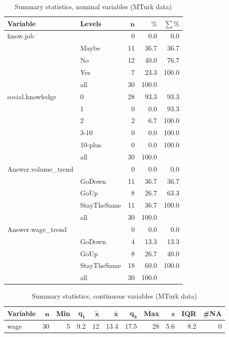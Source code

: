 \documentclass[a4paper,10pt]{article}\usepackage[]{graphicx}\usepackage[]{color}
\begin{document}
\begin{table}[ht]
\centering
{\footnotesize
\begin{tabular}{ll|rrr}
 \textbf{Variable} & \textbf{Levels} & $\mathbf{n}$ & $\mathbf{\%}$ & $\mathbf{\sum \%}$ \\ 
  \hline
know.job &  & 0 & 0.0 & 0.0 \\ 
   & Maybe & 11 & 36.7 & 36.7 \\ 
   & No & 12 & 40.0 & 76.7 \\ 
   & Yes & 7 & 23.3 & 100.0 \\ 
   \hline
 & all & 30 & 100.0 &  \\ 
   \hline
\hline
social.knowledge & 0 & 28 & 93.3 & 93.3 \\ 
   & 1 & 0 & 0.0 & 93.3 \\ 
   & 2 & 2 & 6.7 & 100.0 \\ 
   & 3-10 & 0 & 0.0 & 100.0 \\ 
   & 10-plus & 0 & 0.0 & 100.0 \\ 
   \hline
 & all & 30 & 100.0 &  \\ 
   \hline
\hline
Answer.volume\_trend &  & 0 & 0.0 & 0.0 \\ 
   & GoDown & 11 & 36.7 & 36.7 \\ 
   & GoUp & 8 & 26.7 & 63.3 \\ 
   & StayTheSame & 11 & 36.7 & 100.0 \\ 
   \hline
 & all & 30 & 100.0 &  \\ 
   \hline
\hline
Answer.wage\_trend &  & 0 & 0.0 & 0.0 \\ 
   & GoDown & 4 & 13.3 & 13.3 \\ 
   & GoUp & 8 & 26.7 & 40.0 \\ 
   & StayTheSame & 18 & 60.0 & 100.0 \\ 
   \hline
 & all & 30 & 100.0 &  \\ 
   \hline
\hline
\end{tabular}
}
\caption{Summary statistics, nominal variables (MTurk data)} 
\label{tab1:51-9110}
\end{table}
\begin{table}[ht]
\centering
{\footnotesize
\begin{tabular}{lrrrrrrrrrr}
 \textbf{Variable} & $\mathbf{n}$ & \textbf{Min} & $\mathbf{q_1}$ & $\mathbf{\widetilde{x}}$ & $\mathbf{\bar{x}}$ & $\mathbf{q_3}$ & \textbf{Max} & $\mathbf{s}$ & \textbf{IQR} & \textbf{\#NA} \\ 
  \hline
wage & 30 & 5 & 9.2 & 12 & 13.4 & 17.5 & 28 & 5.6 & 8.2 & 0 \\ 
  \end{tabular}
}
\caption{Summary statistics, continuous variables (MTurk data)} 
\label{tab2:51-9110}
\end{table}
\end{document}
